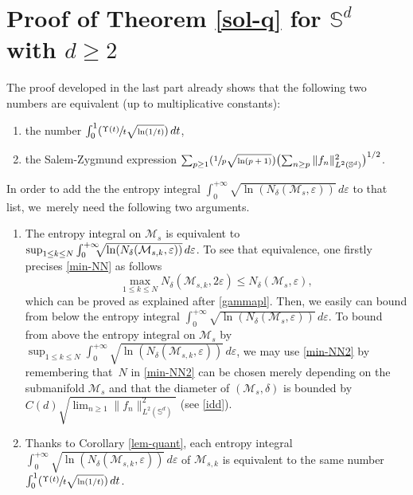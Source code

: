 \documentclass[10pt]{amsart}
\newcommand{\Psfrac}[2]{(\sfrac{#1}{#2})}
\newenvironment{enumeratei}
{\bgroup\def\theenumi{\roman{enumi}}\def\theenumii{\arabic{enumii}}\begin{enumerate}}
{\end{enumerate}\egroup}
\theoremstyle{theorem}
\theoremstyle{definition}
\newcommand\bbS{\mathbb{S}}
\newcommand\ep{\varepsilon}
\begin{document}
\section{Proof of Theorem \ref{sol-q} for \texorpdfstring{$\bbS^d$ with $d\geq 2$}{Sd2}}\label{preuv-solq}

The proof developed in the last part already shows that the following two numbers are equivalent (up to multiplicative constants):
\begin{enumeratei}
\item the number $ \int_{0}^1 \Psfrac{\Upsilon(t)}{t\sqrt{\ln(1/t)}}\, dt$,
\item the Salem-Zygmund expression $\sum_{p\geq 1} \Psfrac{1}{p\sqrt{\ln(p+1)}} \bigl(\sum_{n\geq p} \|f_n\|_{L^2(\bbS^d)}^2 \bigr)^{1/2}$.
\end{enumeratei}
In order to add the the entropy integral $\int_{0}^{+\infty} \sqrt{\ln(N_{\delta}(\mathcal{M}_s,\ep))}\,d\ep$ to that list, we~merely need the following two arguments.

\begin{enumerate}\renewcommand{\theenumi}{\alph{enumi}}
\item
The entropy integral on $\mathcal{M}_s$ is equivalent to $\sup_{1\leq k\leq N}
\int_{0}^{+\infty} \hspace*{-2mm}\sqrt{\ln(N_{\delta}(\mathcal{M}_{s,k},\ep))}\,d\ep$. To see that equivalence, one firstly precises \eqref{min-NN} as follows
\begin{equation*}
\max_{1\leq k\leq N} N_{\delta}(\mathcal{M}_{s,k},2\ep) \leq N_{\delta}(\mathcal{M}_s,\ep),
\end{equation*}
which can be proved as explained after \eqref{gammapl}. Then, we easily can bound from below the
entropy integral $
\int_{0}^{+\infty} \sqrt{\ln(N_{\delta}(\mathcal{M}_s,\ep))}\,d\ep$. To bound from above the entropy integral on $\mathcal{M}_s$ by $\sup_{1\leq k\leq N}
\int_{0}^{+\infty} \sqrt{\ln(N_{\delta}(\mathcal{M}_{s,k},\ep))}\,d\ep$, we may use \eqref{min-NN2} by remembering that~$N$ in
\eqref{min-NN2} can be chosen merely depending on the submanifold $\mathcal{M}_s$ and that the diameter of $(\mathcal{M}_s,\delta)$ is bounded by $C(d)\sqrt{\lim_{n\geq 1} \|f_n\|_{L^2(\bbS^d)}^2}$ (see \eqref{idd}).

\item
Thanks to Corollary \ref{lem-quant}, each entropy integral
$\int_{0}^{+\infty} \sqrt{\ln(N_{\delta}(\mathcal{M}_{s,k},\ep))}\,d\ep$ of $\mathcal{M}_{s,k}$ is equivalent to the same number $ \int_{0}^1 \Psfrac{\Upsilon(t)}{t\sqrt{\ln(1/t)}} \,dt$.
\end{enumerate}
\end{document}
